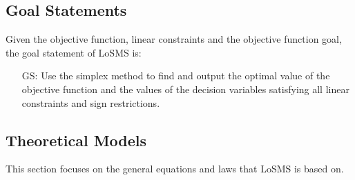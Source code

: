 \documentclass[12pt]{article}
\newcounter{goalnum} %
\newcommand{\famname}{LoSMS} %
\begin{document}
\subsection{Goal Statements}

\noindent Given the objective function, linear constraints and the objective 
function goal, the goal statement of \famname{} is: 

\begin{itemize}
	\item[GS\refstepcounter{goalnum}\thegoalnum \label{goalStatement}:] Use the 
	simplex method to find and output the optimal value of the objective 
	function and the values of the decision variables satisfying all linear 
	constraints and sign restrictions.
\end{itemize}

 

\subsection{Theoretical Models} \label{sec_theoretical}

This section focuses on the general equations and laws that \famname{} is based
on.

~\newline
\end{document}
